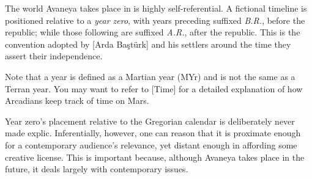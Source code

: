 
\startlines
The world Avaneya takes place in is highly self-referential. A fictional timeline is positioned relative to a {\it year zero}, with years preceding suffixed {\it B.R.}, before the republic; while those following are suffixed {\it A.R.}, after the republic. This is the convention adopted by [Arda Baştürk] and his settlers around the time they assert their independence.

Note that a year is defined as a Martian year (MYr) and is not the same as a Terran year. You may want to refer to [Time] for a detailed explanation of how Arcadians keep track of time on Mars.

Year zero's placement relative to the Gregorian calendar is deliberately never made explic. Inferentially, however, one can reason that it is proximate enough for a contemporary audience's relevance, yet distant enough in affording some creative license. This is important because, although Avaneya takes place in the future, it deals largely with contemporary issues.
\crlf

\page 
\page 
\page 
\page 
\page 
\page 
\page 

\stoplines

\StopChapter

